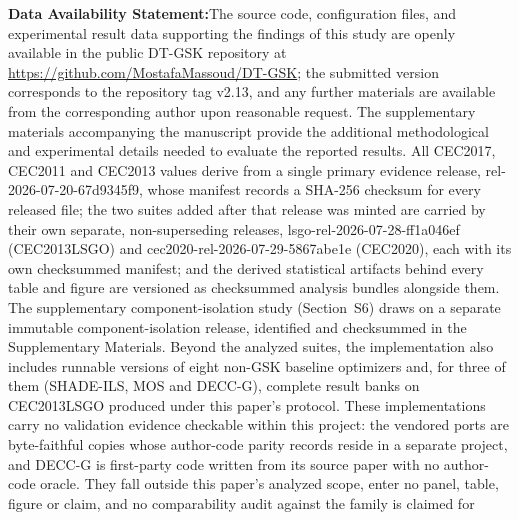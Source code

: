 \documentclass[algorithms,article,submit,moreauthors,pdftex]{Definitions/mdpi}
\newcommand{\dtgsk}{DT-GSK}
\begin{document}
\vspace{1em}
\noindent\textbf{Data Availability Statement:}\quad The source code,
configuration files, and experimental result data supporting the findings of
this study are openly available in the public \dtgsk{} repository at
\url{https://github.com/MostafaMassoud/DT-GSK}; the submitted version
corresponds to the repository tag v2.13, and any further materials are
available from the corresponding author upon reasonable request. The
supplementary materials accompanying the manuscript provide the additional
methodological and experimental details needed to evaluate the reported
results.
All CEC2017, CEC2011 and CEC2013 values derive from a single primary
evidence release, rel-2026-07-20-67d9345f9, whose manifest records a
SHA-256 checksum for every released file; the two suites added after
that release was minted are carried by their own separate,
non-superseding releases, lsgo-rel-2026-07-28-ff1a046ef (CEC2013LSGO)
and cec2020-rel-2026-07-29-5867abe1e (CEC2020), each with its own
checksummed manifest; and the derived statistical artifacts
behind every table and figure are versioned as checksummed analysis
bundles alongside them. The supplementary component-isolation study
(Section~S6) draws on a separate immutable component-isolation release,
identified and checksummed in the Supplementary Materials. %
Beyond the analyzed suites, the implementation also includes runnable
versions of eight non-GSK baseline optimizers and, for three of
them (SHADE-ILS, MOS and DECC-G), complete result banks on CEC2013LSGO
produced under this paper's protocol. These implementations carry no
validation evidence checkable within this project: the vendored ports
are byte-faithful copies whose author-code parity records reside in a
separate project, and DECC-G is first-party code written from its source
paper with no author-code oracle. They fall outside this paper's
analyzed scope, enter no panel, table, figure or claim, and no
comparability audit against the family is claimed for
\end{document}
